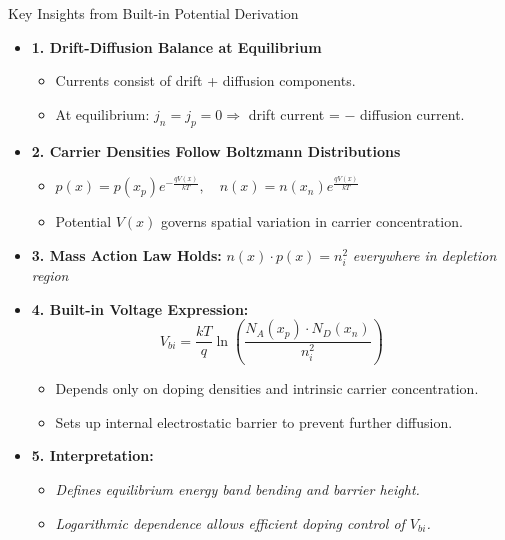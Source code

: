 \begin{frame}{Key Insights from Built-in Potential Derivation}
    \begin{itemize}
		\item \textbf{1. Drift-Diffusion Balance at Equilibrium}
		\begin{itemize}
			\item Currents consist of drift + diffusion components.
			\item At equilibrium: $j_n = j_p = 0 \Rightarrow$ drift current = $-$ diffusion current.
		\end{itemize}

        \item \textbf{2. Carrier Densities Follow Boltzmann Distributions}
        \begin{itemize}
            \item $p(x) = p(x_p) e^{-\frac{qV(x)}{kT}},\quad n(x) = n(x_n) e^{\frac{qV(x)}{kT}}$
            \item Potential $V(x)$ governs spatial variation in carrier concentration.
        \end{itemize}

        \item \textbf{3. Mass Action Law Holds:} $n(x) \cdot p(x) = n_i^2$ \textit{everywhere in depletion region}

        \item \textbf{4. Built-in Voltage Expression:}
        \begin{equation}
            V_{bi} = \frac{kT}{q} \ln\left(\frac{N_A(x_p) \cdot N_D(x_n)}{n_i^2}\right)
		\end{equation}
        \begin{itemize}
            \item Depends only on doping densities and intrinsic carrier concentration.
            \item Sets up internal electrostatic barrier to prevent further diffusion.
        \end{itemize}

        \item \textbf{5. Interpretation:}
        \begin{itemize}
            \item \textit{Defines equilibrium energy band bending and barrier height.}
            \item \textit{Logarithmic dependence allows efficient doping control of $V_{bi}$.}
        \end{itemize}
    \end{itemize}
\end{frame}
